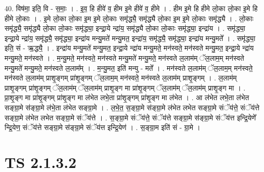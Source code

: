 \documentclass[17pt]{extarticle}
\begin{document}
40. विष॑मा॒ इति॒ वि - स॒माः॒ । . इ॒व॒ हि हीवे॑ व॒ हीम इ॒मे हीवे॑ व॒ हीमे । . हीम इ॒मे हि हीमे लो॒का लो॒का इ॒मे हि हीमे लो॒काः । . इ॒मे लो॒का लो॒का इ॒म इ॒मे लो॒काः समृ॑द्ध्यै॒ समृ॑द्ध्यै लो॒का इ॒म इ॒मे लो॒काः समृ॑द्ध्यै । . लो॒काः समृ॑द्ध्यै॒ समृ॑द्ध्यै लो॒का लो॒काः समृ॑द्ध्या॒ इन्द्रा॒ये न्द्रा॑य॒ समृ॑द्ध्यै लो॒का लो॒काः समृ॑द्ध्या॒ इन्द्रा॑य । . समृ॑द्ध्या॒ इन्द्रा॒ये न्द्रा॑य॒ समृ॑द्ध्यै॒ समृ॑द्ध्या॒ इन्द्रा॑य मन्यु॒मते॑ मन्यु॒मत॒ इन्द्रा॑य॒ समृ॑द्ध्यै॒ समृ॑द्ध्या॒ इन्द्रा॑य मन्यु॒मते᳚ । . समृ॑द्ध्या॒ इति॒ सं - ऋ॒द्ध्यै॒ । . इन्द्रा॑य मन्यु॒मते॑ मन्यु॒मत॒ इन्द्रा॒ये न्द्रा॑य मन्यु॒मते॒ मन॑स्वते॒ मन॑स्वते मन्यु॒मत॒ इन्द्रा॒ये न्द्रा॑य मन्यु॒मते॒ मन॑स्वते । . म॒न्यु॒मते॒ मन॑स्वते॒ मन॑स्वते मन्यु॒मते॑ मन्यु॒मते॒ मन॑स्वते ल॒लाम॑म् ॅल॒लाम॒म् मन॑स्वते मन्यु॒मते॑ मन्यु॒मते॒ मन॑स्वते ल॒लाम᳚म् । . म॒न्यु॒मत॒ इति॑ मन्यु - मते᳚ । . मन॑स्वते ल॒लाम॑म् ॅल॒लाम॒म् मन॑स्वते॒ मन॑स्वते ल॒लाम॑म् प्राशृ॒ङ्गम् प्रा॑शृ॒ङ्गम् ॅल॒लाम॒म् मन॑स्वते॒ मन॑स्वते ल॒लाम॑म् प्राशृ॒ङ्गम् । . ल॒लाम॑म् प्राशृ॒ङ्गम् प्रा॑शृ॒ङ्गम् ॅल॒लाम॑म् ॅल॒लाम॑म् प्राशृ॒ङ्ग मा प्रा॑शृ॒ङ्गम् ॅल॒लाम॑म् ॅल॒लाम॑म् प्राशृ॒ङ्ग मा । . प्रा॒शृ॒ङ्ग मा प्रा॑शृ॒ङ्गम् प्रा॑शृ॒ङ्ग मा ल॑भेत लभे॒ता प्रा॑शृ॒ङ्गम् प्रा॑शृ॒ङ्ग मा ल॑भेत । . आ ल॑भेत लभे॒ता ल॑भेत सङ्ग्रा॒मे स॑ङ्ग्रा॒मे ल॑भे॒ता ल॑भेत सङ्ग्रा॒मे । . ल॒भे॒त॒ स॒ङ्ग्रा॒मे स॑ङ्ग्रा॒मे ल॑भेत लभेत सङ्ग्रा॒मे संॅय॑त्ते॒ संॅय॑त्ते सङ्ग्रा॒मे ल॑भेत लभेत सङ्ग्रा॒मे संॅय॑त्ते । . स॒ङ्ग्रा॒मे संॅय॑त्ते॒ संॅय॑त्ते सङ्ग्रा॒मे स॑ङ्ग्रा॒मे संॅय॑त्त इन्द्रि॒येणे᳚ न्द्रि॒येण॒ संॅय॑त्ते सङ्ग्रा॒मे स॑ङ्ग्रा॒मे संॅय॑त्त इन्द्रि॒येण॑ । . स॒ङ्ग्रा॒म इति॑ सं - ग्रा॒मे । \newline
\pagebreak
{}
\section*{ TS 2.1.3.2 }
\end{document}
